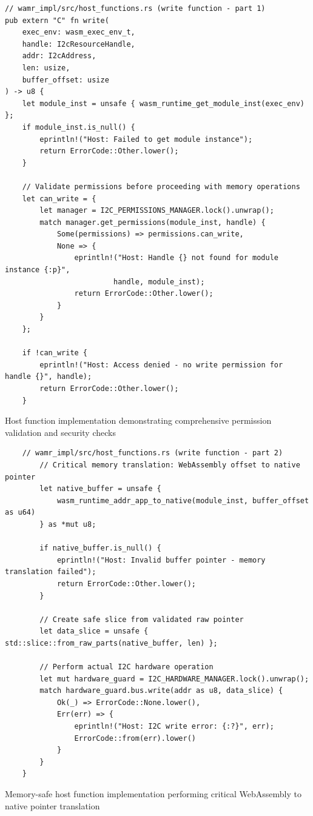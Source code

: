 \begin{listing}[H]
\begin{verbatim}
// wamr_impl/src/host_functions.rs (write function - part 1)
pub extern "C" fn write(
    exec_env: wasm_exec_env_t,
    handle: I2cResourceHandle,
    addr: I2cAddress,
    len: usize,
    buffer_offset: usize
) -> u8 {
    let module_inst = unsafe { wasm_runtime_get_module_inst(exec_env) };
    if module_inst.is_null() {
        eprintln!("Host: Failed to get module instance");
        return ErrorCode::Other.lower();
    }

    // Validate permissions before proceeding with memory operations
    let can_write = {
        let manager = I2C_PERMISSIONS_MANAGER.lock().unwrap();
        match manager.get_permissions(module_inst, handle) {
            Some(permissions) => permissions.can_write,
            None => {
                eprintln!("Host: Handle {} not found for module instance {:p}", 
                         handle, module_inst);
                return ErrorCode::Other.lower();
            }
        }
    };

    if !can_write {
        eprintln!("Host: Access denied - no write permission for handle {}", handle);
        return ErrorCode::Other.lower();
    }
\end{verbatim}
\caption{Host function implementation demonstrating comprehensive permission validation and security checks}
\label{lst:wamr-host-function-pt1}
\end{listing}

\begin{listing}[H]
    \begin{verbatim}
    // wamr_impl/src/host_functions.rs (write function - part 2)
        // Critical memory translation: WebAssembly offset to native pointer
        let native_buffer = unsafe {
            wasm_runtime_addr_app_to_native(module_inst, buffer_offset as u64)
        } as *mut u8;
        
        if native_buffer.is_null() {
            eprintln!("Host: Invalid buffer pointer - memory translation failed");
            return ErrorCode::Other.lower();
        }
    
        // Create safe slice from validated raw pointer
        let data_slice = unsafe { std::slice::from_raw_parts(native_buffer, len) };
        
        // Perform actual I2C hardware operation
        let mut hardware_guard = I2C_HARDWARE_MANAGER.lock().unwrap();
        match hardware_guard.bus.write(addr as u8, data_slice) {
            Ok(_) => ErrorCode::None.lower(),
            Err(err) => {
                eprintln!("Host: I2C write error: {:?}", err);
                ErrorCode::from(err).lower()
            }
        }
    }
    \end{verbatim}
    \caption{Memory-safe host function implementation performing critical WebAssembly to native pointer translation}
    \label{lst:wamr-host-function-pt2}
\end{listing}

